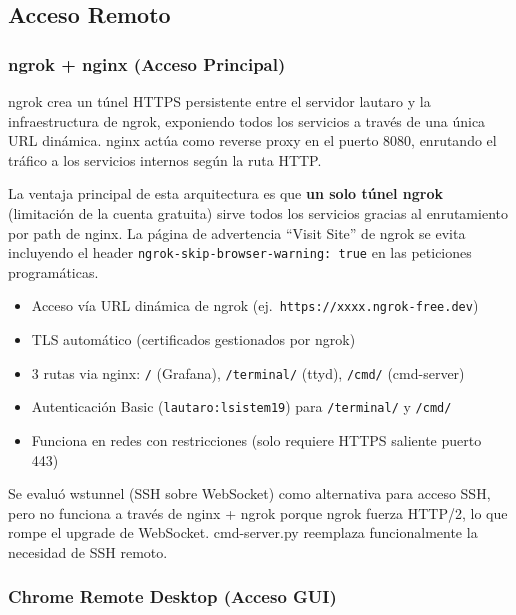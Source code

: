 \documentclass[12pt,a4paper]{article}
\begin{document}
\subsection{Acceso Remoto}

\subsubsection{ngrok + nginx (Acceso Principal)}

ngrok crea un t\'unel HTTPS persistente entre el servidor lautaro y la infraestructura de ngrok, exponiendo todos los servicios a trav\'es de una \'unica URL din\'amica. nginx act\'ua como reverse proxy en el puerto 8080, enrutando el tr\'afico a los servicios internos seg\'un la ruta HTTP.

La ventaja principal de esta arquitectura es que \textbf{un solo t\'unel ngrok} (limitaci\'on de la cuenta gratuita) sirve todos los servicios gracias al enrutamiento por path de nginx. La p\'agina de advertencia ``Visit Site'' de ngrok se evita incluyendo el header \texttt{ngrok-skip-browser-warning: true} en las peticiones program\'aticas.

\begin{itemize}
    \item Acceso v\'ia URL din\'amica de ngrok (ej.\ \texttt{https://xxxx.ngrok-free.dev})
    \item TLS autom\'atico (certificados gestionados por ngrok)
    \item 3 rutas via nginx: \texttt{/} (Grafana), \texttt{/terminal/} (ttyd), \texttt{/cmd/} (cmd-server)
    \item Autenticaci\'on Basic (\texttt{lautaro:lsistem19}) para \texttt{/terminal/} y \texttt{/cmd/}
    \item Funciona en redes con restricciones (solo requiere HTTPS saliente puerto 443)
\end{itemize}

\begin{notebox}
Se evalu\'o wstunnel (SSH sobre WebSocket) como alternativa para acceso SSH, pero no funciona a trav\'es de nginx + ngrok porque ngrok fuerza HTTP/2, lo que rompe el upgrade de WebSocket. cmd-server.py reemplaza funcionalmente la necesidad de SSH remoto.
\end{notebox}

\subsubsection{Chrome Remote Desktop (Acceso GUI)}
\end{document}
